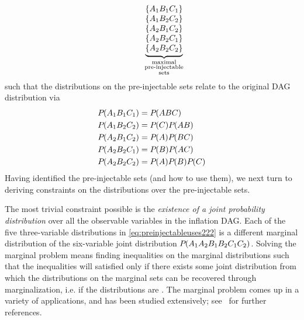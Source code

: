 \begin{align}
\qquad\quad
{\underbrace{\begin{matrix}
\\
\left\lbrace A_1 B_1 C_1\right\rbrace \\
\left\lbrace A_1 B_2 C_2\right\rbrace \\
\left\lbrace A_2 B_1 C_2\right\rbrace \\
\left\lbrace A_2 B_2 C_1\right\rbrace \\
\left\lbrace A_2 B_2 C_2\right\rbrace
\end{matrix}}_{\substack{\text{maximal}\\\text{pre-injectable}\\\text{sets}}}}
\end{align}
such that the distributions on the pre-injectable sets relate to the original DAG distribution via
\begin{align}\label{eq:preinjectableuses222}
\begin{split}
&{P_{}}\lparen A_1 B_1 C_1\rparen = {P_{}}\lparen A B C\rparen \\
&{P_{}}\lparen A_1 B_2 C_2\rparen = {P_{}}\lparen C\rparen{P_{}}\lparen A B\rparen\\
&{P_{}}\lparen A_2 B_1 C_2\rparen = {P_{}}\lparen A\rparen{P_{}}\lparen B C\rparen\\
&{P_{}}\lparen A_2 B_2 C_1\rparen = {P_{}}\lparen B\rparen{P_{}}\lparen A C\rparen\\
&{P_{}}\lparen A_2 B_2 C_2\rparen = {P_{}}\lparen A\rparen{P_{}}\lparen B\rparen{P_{}}\lparen C\rparen
\end{split}
\end{align}
Having identified the pre-injectable sets (and how to use them), we next turn to deriving constraints on the distributions over the pre-injectable sets.


\label{step:marginalsproblem}\par\smallskip\nobreak

The most trivial constraint possible 
is the \emph{existence of a joint probability distribution} over all the observable variables in the inflation DAG. Each of the five three-variable distributions in \cref{eq:preinjectableuses222} is a different marginal distribution of the six-variable joint distribution ${P_{}}\lparen A_1 A_2 B_1 B_2 C_1 C_2\rparen$. Solving the marginal problem means finding inequalities on the marginal distributions such that the inequalities will satisfied only if there exists some joint distribution from which the distributions on the marginal sets can be recovered through marginalization, i.e. if the distributions are . The marginal problem comes up in a variety of applications, and has been studied extensively; see~\cite{fritz2013marginal} for further references.  

